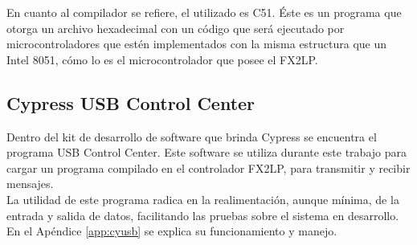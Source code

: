 	En cuanto al compilador se refiere, el utilizado es C51. Éste es un programa que otorga un archivo hexadecimal con un código que será ejecutado por microcontroladores que estén implementados con la misma estructura que un Intel 8051, cómo lo es el microcontrolador que posee el FX2LP.\\
	
	\subsection{Cypress USB Control Center}
	Dentro del kit de desarrollo de software que brinda Cypress se encuentra el programa USB Control Center. Este software se utiliza durante este trabajo para cargar un programa compilado en el controlador FX2LP, para transmitir y recibir mensajes.\\
	
	La utilidad de este programa radica en la realimentación, aunque mínima, de la entrada y salida de datos, facilitando las pruebas sobre el sistema en desarrollo.\\
	
	En el Apéndice \ref{app:cyusb} se explica su funcionamiento y manejo.
	